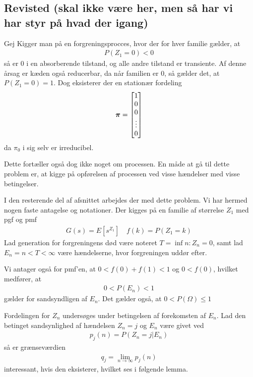 \subsection{Revisted (skal ikke være her, men så har vi har styr på hvad der igang)}
Gej
Kigger man på en forgreningsprocces, hvor der for hver familie gælder, at   
\begin{align*}
P(Z_1=0)<0    
\end{align*}
så er $0$ i en absorberende tilstand, og alle andre tilstand er transiente. Af denne årsag er kæden også reducerbar, %
 da når familien er $0$, så gælder det, at $P(Z_1=0)=1$. Dog eksisterer der en stationær fordeling 
\begin{align*}
    \boldsymbol{\pi}=\begin{bmatrix}
1\\
0\\
0\\
\vdots\\
0
\end{bmatrix}
\end{align*}
da $\pi_0$ i sig selv er irreducibel.  

Dette fortæller også dog ikke noget om processen. En måde at gå til dette problem er, at kigge på opførelsen af processen ved visse hændelser med visse betingelser. 

I den resterende del af afsnittet arbejdes der med dette problem. Vi har hermed nogen faste antagelse og notationer. Der kigges på en familie af størrelse $Z_1$ med pgf og pmf 
\begin{align*}
    G(s)=E[s^{Z_1}] \quad f(k)=P(Z_1=k)
\end{align*} 
Lad generation for forgreningens død være noteret $T=\inf{n:Z_n=0}$, samt  
lad $E_n={n<T<\infty}$
være hændelserne, hvor forgreningen uddør efter. 

Vi antager også for pmf'en, at $0<f(0)+f(1)<1$ og $0<f(0)$, hvilket medfører, at 
\begin{align*}
    0<P(E_n)<1    
\end{align*}
gælder for sandsyndligen af $E_n$. Det gælder også, at $0< P(\Omega)\leq 1$

Fordelingen for $Z_n$ undersøges under betingelsen af forekomsten af $E_n$. Lad den betinget sandsynlighed af hændelsen $Z_n=j$ og $E_n$ være givet ved 
\begin{align*}
    p_j(n)=P(Z_n=j | E_n)
\end{align*}
så er grænseværdien 
\begin{align*}
q_j=\lim_{n\to \infty} p_j(n)    
\end{align*}
interessant, hvis den eksisterer, hvilket ses i følgende lemma. 

